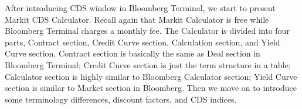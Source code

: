 \documentclass{jss}
\begin{document}
After introducing CDS window in Bloomberg Terminal, we start to present Markit CDS Calculator. Recall again that Markit Calculator is free while Bloomberg Terminal charges a monthly fee. The Calculator is divided into four parts,  Contract section, Credit Curve section, Calculation section, and Yield Curve section. Contract section is basically the same as Deal section in Bloomberg Terminal; Credit Curve section is just the term structure in a table; Calculator section is highly similar to Bloomberg Calculator section; Yield Curve section is similar to Market section in Bloomberg. Then we move on to introduce some terminology differences, discount factors, and CDS indices.

\newpage





\cite{barclays}
\cite{bloomberg}
\cite{openGamma}
\cite{glossary}
\cite{cdsOrigins}
\cite{blythe}
\cite{jk}
\cite{rates}
\cite{creditDerivatives}
\end{document}
